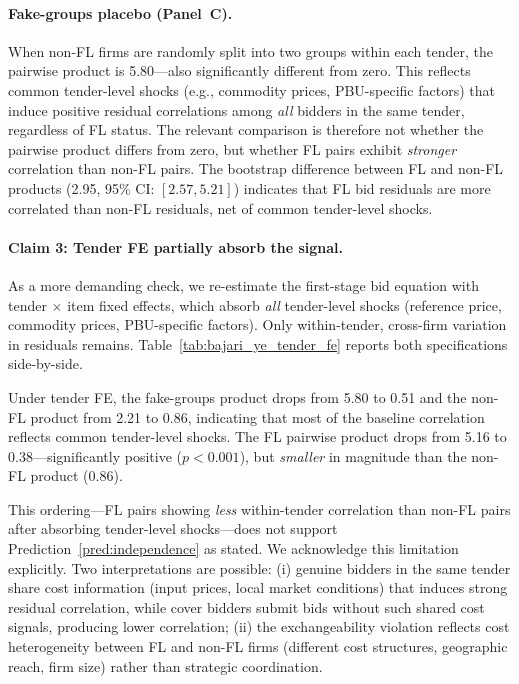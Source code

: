 \paragraph{Fake-groups placebo (Panel~C).}
When non-FL firms are randomly split into two groups within each tender,
the pairwise product is 5.80---also significantly different from zero.
This reflects common tender-level shocks (e.g., commodity prices,
PBU-specific factors) that induce positive residual correlations among
\emph{all} bidders in the same tender, regardless of FL status. The
relevant comparison is therefore not whether the pairwise product differs
from zero, but whether FL pairs exhibit \emph{stronger} correlation than
non-FL pairs. The bootstrap difference between FL and non-FL products
(2.95, 95\% CI: $[2.57, 5.21]$) indicates that FL bid residuals are
more correlated than non-FL residuals, net of common tender-level shocks.

\paragraph{Claim 3: Tender FE partially absorb the signal.} %
As a more demanding check, we re-estimate the first-stage bid equation
with tender $\times$ item fixed effects, which absorb \emph{all}
tender-level shocks (reference price, commodity prices, PBU-specific
factors). Only within-tender, cross-firm variation in residuals remains.
Table~\ref{tab:bajari_ye_tender_fe} reports both specifications
side-by-side. %


Under tender FE, the fake-groups product drops from 5.80 to 0.51 and
the non-FL product from 2.21 to 0.86, indicating that most of the
baseline correlation reflects common tender-level shocks. The FL pairwise
product drops from 5.16 to 0.38---significantly positive ($p < 0.001$),
but \emph{smaller} in magnitude than the non-FL product (0.86).

This ordering---FL pairs showing \emph{less} within-tender correlation
than non-FL pairs after absorbing tender-level shocks---does not support
Prediction~\ref{pred:independence} as stated. We acknowledge this
limitation explicitly. Two interpretations are possible: (i) genuine
bidders in the same tender share cost information (input prices, local
market conditions) that induces strong residual correlation, while cover
bidders submit bids without such shared cost signals, producing lower
correlation; (ii) the exchangeability violation reflects cost
heterogeneity between FL and non-FL firms (different cost structures,
geographic reach, firm size) rather than strategic coordination.

